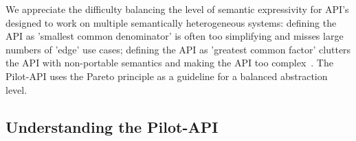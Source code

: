 \documentclass{sig-alternate}
\begin{document}
We appreciate the difficulty balancing the level of semantic
expressivity for API's designed to work on multiple semantically
heterogeneous systems: defining the API as 'smallest common
denominator' is often too simplifying and misses large numbers of
'edge' use cases; defining the API as 'greatest common factor'
clutters the API with non-portable semantics and making the API too
complex~\cite{leaky_abstractions}.  The Pilot-API uses the Pareto
principle as a guideline for a balanced abstraction level.







\subsection{Understanding the Pilot-API}


\end{document}
